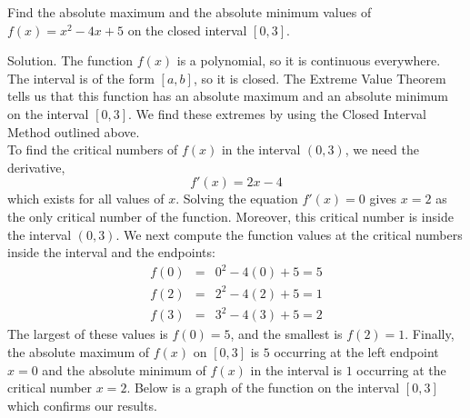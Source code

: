 \documentclass[handout]{ximera}
\begin{document}
\begin{example}[example 1] Find the absolute maximum and the absolute minimum values of $f(x) = x^2 - 4x + 5$ on the closed interval $[0, 3]$.

Solution. The function $f(x)$ is a polynomial, so it is continuous everywhere. 
The interval is of the form $[a,b]$, so it is closed. 
The Extreme Value Theorem tells us that this function has an absolute 
maximum and an absolute minimum on the interval $[0,3]$.
We find these extremes by using the Closed Interval Method outlined above.\\
To find the critical numbers of $f(x)$ in the interval $(0, 3)$, we need the derivative,  
\[
f'(x) = 2x - 4
\]
which exists for all values of $x$.
Solving the equation $f'(x) =0$ gives $x=2$ as the only critical number of the function.
Moreover, this critical number is inside the interval $(0,3)$.
We next compute the function values at the critical numbers inside the interval and the endpoints:
\begin{eqnarray*}
f(0) &=& 0^2 - 4(0) + 5 =5\\
f(2) &=& 2^2 - 4(2) + 5 = 1\\
f(3) &=& 3^2 - 4(3) + 5 = 2
\end{eqnarray*}
The largest of these values is $f(0) = 5$, and the smallest is $f(2) = 1$. 
Finally, the absolute maximum of $f(x)$ on $[0,3]$ is $5$ occurring 
at the left endpoint $x = 0$ and the absolute minimum of $f(x)$ in the interval is $1$
occurring at the critical number $x = 2$. Below is a graph of the function on the interval $[0,3]$ which confirms our results.
\begin{image}
\end{image}
\end{example}
\end{document}
